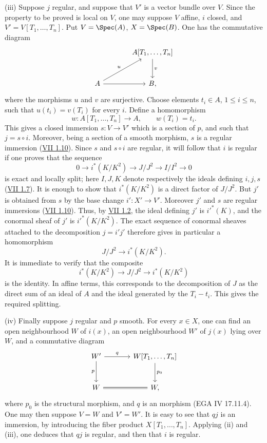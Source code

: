(iii) Suppose $j$ regular, and suppose that $V'$ is a vector bundle over $V$. Since the property to be proved is local on $V$, one may suppose $V$ affine, $i$ closed, and $V'=V[T_1,\ldots,T_n]$. Put $V=\Spec(A)$, $X=\Spec(B)$. One has the commutative diagram
\[
\begin{tikzcd}[column sep=large,row sep=large]
& A[T_1,\ldots,T_n] \arrow[d,"v"]\\
A \arrow[r] \arrow[ur,"u"] & B,
\end{tikzcd}
\]
where the morphisms $u$ and $v$ are surjective. Choose elements $t_i\in A$, $1\leq i\leq n$, such that $u(t_i)=v(T_i)$ for every $i$. Define a homomorphism
\[
w:A[T_1,\ldots,T_n]\longrightarrow A,
\qquad w(T_i)=t_i.
\]
This gives a closed immersion $s:V\to V'$ which is a section of $p$, and such that $j=s\circ i$. Moreover, being a section of a smooth morphism, $s$ is a regular immersion (\hyperlink{sga6.e07.prop.1-10}{VII 1.10}). Since $s$ and $s\circ i$ are regular, it will follow that $i$ is regular if one proves that the sequence
\[
0\longrightarrow i^*(K/K^2)\longrightarrow J/J^2\longrightarrow I/I^2\longrightarrow 0
\]
is exact and locally split; here $I,J,K$ denote respectively the ideals defining $i,j,s$ (\hyperlink{sga6.e07.prop.1-7}{VII 1.7}). It is enough to show that $i^*(K/K^2)$ is a direct factor of $J/J^2$. But $j'$ is obtained from $s$ by the base change $i':X'\to V'$. Moreover $j'$ and $s$ are regular immersions (\hyperlink{sga6.e07.prop.1-10}{VII 1.10}). Thus, by \hyperlink{sga6.e07.lem.1-2}{VII 1.2}, the ideal defining $j'$ is $i'^*(K)$, and the conormal sheaf of $j'$ is $i'^*(K/K^2)$. The exact sequence of conormal sheaves attached to the decomposition $j=i'j'$ therefore gives in particular a homomorphism
\[
J/J^2\longrightarrow i^*(K/K^2).
\]
It is immediate to verify that the composite
\[
i^*(K/K^2)\longrightarrow J/J^2\longrightarrow i^*(K/K^2)
\]
is the identity. In affine terms, this corresponds to the decomposition of $J$ as the direct sum of an ideal of $A$ and the ideal generated by the $T_i-t_i$. This gives the required splitting.

(iv) Finally suppose $j$ regular and $p$ smooth. For every $x\in X$, one can find an open neighbourhood $W$ of $i(x)$, an open neighbourhood $W'$ of $j(x)$ lying over $W$, and a commutative diagram
\[
\begin{tikzcd}[column sep=large,row sep=large]
W' \arrow[r,"q"] \arrow[d,"p"'] & W[T_1,\ldots,T_n] \arrow[d,"p_0"]\\
W \arrow[r,equal] & W,
\end{tikzcd}
\]
where $p_0$ is the structural morphism, and $q$ is an \etale morphism (EGA IV 17.11.4). One may then suppose $V=W$ and $V'=W'$. It is easy to see that $qj$ is an immersion, by introducing the fiber product $X[T_1,\ldots,T_n]$. Applying (ii) and (iii), one deduces that $qj$ is regular, and then that $i$ is regular.

